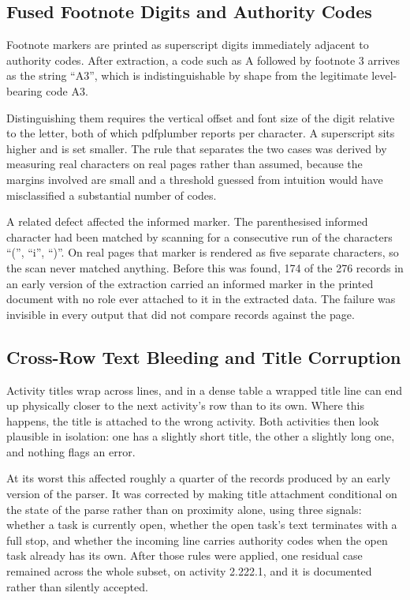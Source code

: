 \subsection{Fused Footnote Digits and Authority Codes}

Footnote markers are printed as superscript digits immediately adjacent to authority codes. After extraction, a code such as A followed by footnote 3 arrives as the string ``A3'', which is indistinguishable by shape from the legitimate level-bearing code A3.

Distinguishing them requires the vertical offset and font size of the digit relative to the letter, both of which pdfplumber reports per character. A superscript sits higher and is set smaller. The rule that separates the two cases was derived by measuring real characters on real pages rather than assumed, because the margins involved are small and a threshold guessed from intuition would have misclassified a substantial number of codes.

A related defect affected the informed marker. The parenthesised informed character had been matched by scanning for a consecutive run of the characters ``('', ``i'', ``)''. On real pages that marker is rendered as five separate characters, so the scan never matched anything. Before this was found, 174 of the 276 records in an early version of the extraction carried an informed marker in the printed document with no role ever attached to it in the extracted data. The failure was invisible in every output that did not compare records against the page.

\subsection{Cross-Row Text Bleeding and Title Corruption}

Activity titles wrap across lines, and in a dense table a wrapped title line can end up physically closer to the next activity's row than to its own. Where this happens, the title is attached to the wrong activity. Both activities then look plausible in isolation: one has a slightly short title, the other a slightly long one, and nothing flags an error.

At its worst this affected roughly a quarter of the records produced by an early version of the parser. It was corrected by making title attachment conditional on the state of the parse rather than on proximity alone, using three signals: whether a task is currently open, whether the open task's text terminates with a full stop, and whether the incoming line carries authority codes when the open task already has its own. After those rules were applied, one residual case remained across the whole subset, on activity 2.222.1, and it is documented rather than silently accepted.

